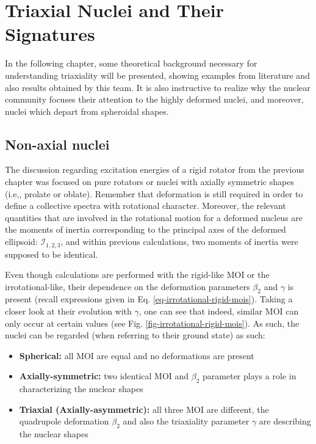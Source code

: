 \chapter{Triaxial Nuclei and Their Signatures}
\label{chapter4}

In the following chapter, some theoretical background necessary for understanding triaxiality will be presented, showing examples from literature and also results obtained by this team. It is also instructive to realize why the nuclear community focuses their attention to the highly deformed nuclei, and moreover, nuclei which depart from spheroidal shapes.

\section{Non-axial nuclei}

The discussion regarding excitation energies of a rigid rotator from the previous chapter was focused on pure rotators or nuclei with axially symmetric shapes (i.e,, prolate or oblate). Remember that deformation is still required in order to define a collective spectra with rotational character. Moreover, the relevant quantities that are involved in the rotational motion for a deformed nucleus are the moments of inertia corresponding to the principal axes of the deformed ellipsoid: $\mathcal{I}_{1,2,3}$, and within previous calculations, two moments of inertia were supposed to be identical.

Even though calculations are performed with the rigid-like MOI or the irrotational-like, their dependence on the deformation parameters $\beta_2$ and $\gamma$ is present (recall expressions given in Eq. \ref{eq-irrotational-rigid-mois}). Taking a closer look at their evolution with $\gamma$, one can see that indeed, similar MOI can only occur at certain values (see Fig. \ref{fig-irrotational-rigid-mois}). As such, the nuclei can be regarded (when referring to their ground state) as such:
\begin{itemize}
    \item \textbf{Spherical:} all MOI are equal and no deformations are present
    \item \textbf{Axially-symmetric:} two identical MOI and $\beta_2$ parameter plays a role in characterizing the nuclear shapes 
    \item \textbf{Triaxial (Axially-asymmetric):} all three MOI are different, the quadrupole deformation $\beta_2$ and also the triaxiality parameter $\gamma$ are describing the nuclear shapes
\end{itemize}

